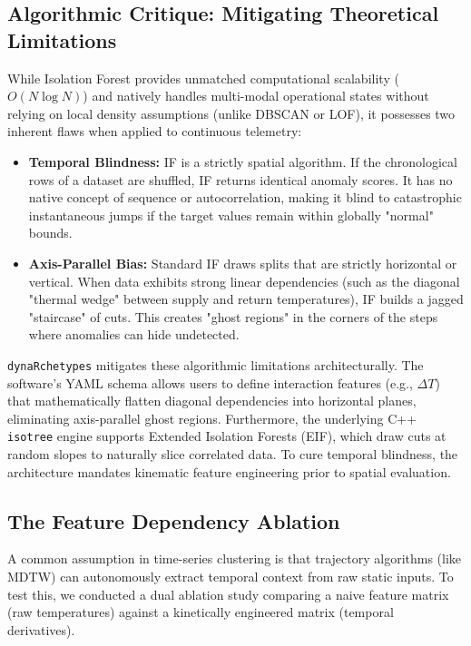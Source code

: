\documentclass[final,3p,times]{elsarticle}
\begin{document}
\subsection{Algorithmic Critique: Mitigating Theoretical Limitations}
While Isolation Forest provides unmatched computational scalability ($O(N \log N)$) and natively handles multi-modal operational states without relying on local density assumptions (unlike DBSCAN or LOF), it possesses two inherent flaws when applied to continuous telemetry:
\begin{itemize}
\item \textbf{Temporal Blindness:} IF is a strictly spatial algorithm. If the chronological rows of a dataset are shuffled, IF returns identical anomaly scores. It has no native concept of sequence or autocorrelation, making it blind to catastrophic instantaneous jumps if the target values remain within globally "normal" bounds.
\item \textbf{Axis-Parallel Bias:} Standard IF draws splits that are strictly horizontal or vertical. When data exhibits strong linear dependencies (such as the diagonal "thermal wedge" between supply and return temperatures), IF builds a jagged "staircase" of cuts. This creates "ghost regions" in the corners of the steps where anomalies can hide undetected.
\end{itemize}

\texttt{dynaRchetypes} mitigates these algorithmic limitations architecturally. The software's YAML schema allows users to define interaction features (e.g., $\Delta T$) that mathematically flatten diagonal dependencies into horizontal planes, eliminating axis-parallel ghost regions. Furthermore, the underlying C++ \texttt{isotree} engine supports Extended Isolation Forests (EIF), which draw cuts at random slopes to naturally slice correlated data. To cure temporal blindness, the architecture mandates kinematic feature engineering prior to spatial evaluation.

\subsection{The Feature Dependency Ablation}
A common assumption in time-series clustering is that trajectory algorithms (like MDTW) can autonomously extract temporal context from raw static inputs. To test this, we conducted a dual ablation study comparing a naive feature matrix (raw temperatures) against a kinetically engineered matrix (temporal derivatives). 
\end{document}
